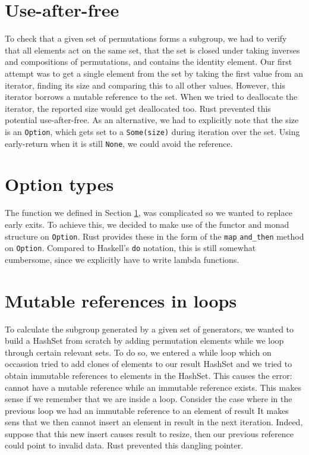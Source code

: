 \documentclass{article}
\begin{document}
\section{Use-after-free} \label{sec:use_after_free}

To check that a given set of permutations forms a subgroup, we had to verify that all elements act on the same set, that the set is closed under taking inverses and compositions of permutations, and contains the identity element. Our first attempt was to get a single element from the set by taking the first value from an iterator, finding its size and comparing this to all other values. However, this iterator borrows a mutable reference to the set. When we tried to deallocate the iterator, the reported size would get deallocated too. Rust prevented this potential use-after-free.
As an alternative, we had to explicitly note that the size is an \texttt{Option}, which gets set to a \texttt{Some(size)} during iteration over the set. Using early-return when it is still \texttt{None}, we could avoid the reference.

\section{Option types}

The function we defined in Section \ref{sec:use_after_free}, was complicated so we wanted to replace early exits. To achieve this, we decided to make use of the functor and monad structure on \texttt{Option}. Rust provides these in the form of the \texttt{map} \texttt{and\_then} method on \texttt{Option}. Compared to Haskell's \texttt{do} notation, this is still somewhat cumbersome, since we explicitly have to write lambda functions.

\section{Mutable references in loops}
To calculate the subgroup generated by a given set of generators, we wanted to build a HashSet from scratch by
adding permutation elements while we loop through certain relevant sets. To do so, we entered a while loop
which on occassion tried to add clones of elements to our result HashSet and we tried to obtain immutable
references to elements in the HashSet. This causes the error: cannot have a mutable reference while an
immutable reference exists. This makes sense if we remember that we are inside a loop. Consider the case where
in the previous loop we had an immutable reference to an element of result It makes sens that we then cannot
insert an element in result in the next iteration. Indeed, suppose that this new insert causes result to
resize, then our previous reference could point to invalid data. Rust prevented this dangling pointer.
\end{document}
